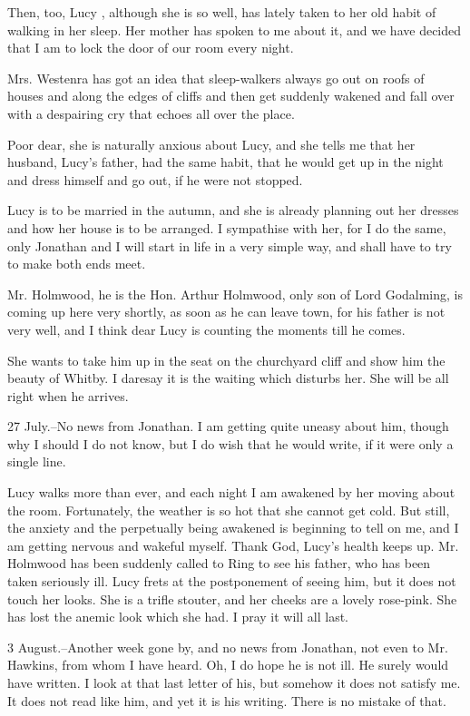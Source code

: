 Then, too, Lucy , although she is so well, has lately taken to her old habit of walking in her sleep. Her mother has spoken to me about it, and we have decided that I am to lock the door of our room every night. 

Mrs. Westenra has got an idea that sleep-walkers always go out on roofs of houses and along the edges of cliffs and then get suddenly wakened and fall over with a despairing cry that echoes all over the place. 

Poor dear, she is naturally anxious about Lucy, and she tells me that her husband, Lucy's father, had the same habit, that he would get up in the night and dress himself and go out, if he were not stopped. 

Lucy is to be married in the autumn, and she is already planning out her dresses and how her house is to be arranged. I sympathise with her, for I do the same, only Jonathan and I will start in life in a very simple way, and shall have to try to make both ends meet. 

Mr. Holmwood, he is the Hon. Arthur Holmwood, only son of Lord Godalming, is coming up here very shortly, as soon as he can leave town, for his father is not very well, and I think dear Lucy is counting the moments till he comes. 

She wants to take him up in the seat on the churchyard cliff and show him the beauty of Whitby. I daresay it is the waiting which disturbs her. She will be all right when he arrives. 

27 July.--No news from Jonathan. I am getting quite uneasy about him, though why I should I do not know, but I do wish that he would write, if it were only a single line. 

Lucy walks more than ever, and each night I am awakened by her moving about the room. Fortunately, the weather is so hot that she cannot get cold. But still, the anxiety and the perpetually being awakened is beginning to tell on me, and I am getting nervous and wakeful myself. Thank God, Lucy's health keeps up. Mr. Holmwood has been suddenly called to Ring to see his father, who has been taken seriously ill. Lucy frets at the postponement of seeing him, but it does not touch her looks. She is a trifle stouter, and her cheeks are a lovely rose-pink. She has lost the anemic look which she had. I pray it will all last. 

3 August.--Another week gone by, and no news from Jonathan, not even to Mr. Hawkins, from whom I have heard. Oh, I do hope he is not ill. He surely would have written. I look at that last letter of his, but somehow it does not satisfy me. It does not read like him, and yet it is his writing. There is no mistake of that. 

